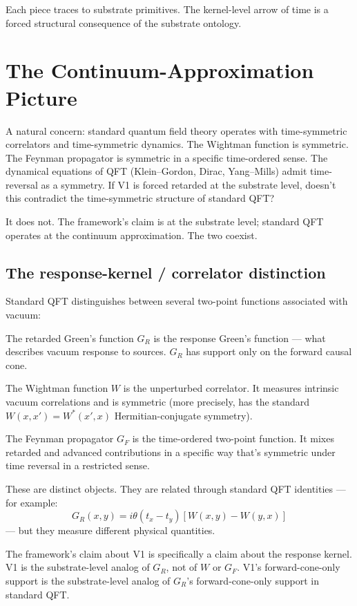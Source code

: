 \documentclass[11pt,a4paper]{article}
\begin{document}
Each piece traces to substrate primitives. The kernel-level arrow of time is a forced structural consequence of the substrate ontology.

\section{The Continuum-Approximation Picture}

A natural concern: standard quantum field theory operates with time-symmetric correlators and time-symmetric dynamics. The Wightman function is symmetric. The Feynman propagator is symmetric in a specific time-ordered sense. The dynamical equations of QFT (Klein--Gordon, Dirac, Yang--Mills) admit time-reversal as a symmetry. If V1 is forced retarded at the substrate level, doesn't this contradict the time-symmetric structure of standard QFT?

It does not. The framework's claim is at the substrate level; standard QFT operates at the continuum approximation. The two coexist.

\subsection{The response-kernel / correlator distinction}

Standard QFT distinguishes between several two-point functions associated with vacuum:

The retarded Green's function $G_R$ is the response Green's function --- what describes vacuum response to sources. $G_R$ has support only on the forward causal cone.

The Wightman function $W$ is the unperturbed correlator. It measures intrinsic vacuum correlations and is symmetric (more precisely, has the standard $W(x, x') = W^*(x', x)$ Hermitian-conjugate symmetry).

The Feynman propagator $G_F$ is the time-ordered two-point function. It mixes retarded and advanced contributions in a specific way that's symmetric under time reversal in a restricted sense.

These are distinct objects. They are related through standard QFT identities --- for example:
\[
G_R(x, y) = i \theta(t_x - t_y) [W(x, y) - W(y, x)]
\]
--- but they measure different physical quantities.

The framework's claim about V1 is specifically a claim about the response kernel. V1 is the substrate-level analog of $G_R$, not of $W$ or $G_F$. V1's forward-cone-only support is the substrate-level analog of $G_R$'s forward-cone-only support in standard QFT.
\end{document}
